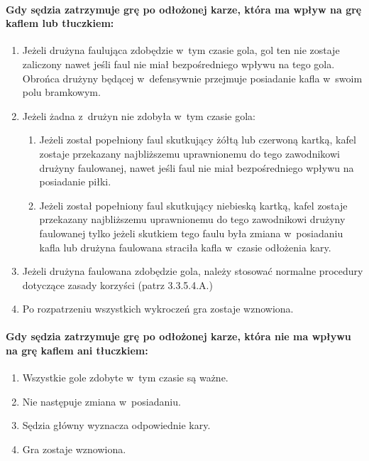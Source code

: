\documentclass[12pt]{article}
\begin{document}
\paragraph{Gdy sędzia zatrzymuje grę po odłożonej karze, która ma
	wpływ na grę kaflem lub tłuczkiem:}

\begin{enumerate}
	\item
	      Jeżeli drużyna faulująca zdobędzie w~tym czasie gola, gol ten nie
	      zostaje zaliczony nawet jeśli faul nie miał bezpośredniego wpływu na
	      tego gola. Obrońca drużyny będącej w~defensywnie przejmuje posiadanie
	      kafla w~swoim polu bramkowym.
	\item
	      Jeżeli żadna z~drużyn nie zdobyła w~tym czasie gola:

	      \begin{enumerate}
		      \item
		            Jeżeli został popełniony faul skutkujący żółtą lub czerwoną kartką,
		            kafel zostaje przekazany najbliższemu uprawnionemu do tego
		            zawodnikowi drużyny faulowanej, nawet jeśli faul nie miał
		            bezpośredniego wpływu na posiadanie piłki.
		      \item
		            Jeżeli został popełniony faul skutkujący niebieską kartką, kafel
		            zostaje przekazany najbliższemu uprawnionemu do tego zawodnikowi
		            drużyny faulowanej tylko jeżeli skutkiem tego faulu była zmiana w~posiadaniu kafla lub drużyna faulowana straciła kafla w~czasie
		            odłożenia kary.
	      \end{enumerate}
	\item
	      Jeżeli drużyna faulowana zdobędzie gola, należy stosować normalne
	      procedury dotyczące zasady korzyści (patrz 3.3.5.4.A.)
	\item
	      Po rozpatrzeniu wszystkich wykroczeń gra zostaje wznowiona.
\end{enumerate}

\paragraph{Gdy sędzia zatrzymuje grę po odłożonej karze, która nie
	ma wpływu na grę kaflem ani tłuczkiem:}

\begin{enumerate}
	\item
	      Wszystkie gole zdobyte w~tym czasie są ważne.
	\item
	      Nie następuje zmiana w~posiadaniu.
	\item
	      Sędzia główny wyznacza odpowiednie kary.
	\item
	      Gra zostaje wznowiona.
\end{enumerate}
\end{document}
